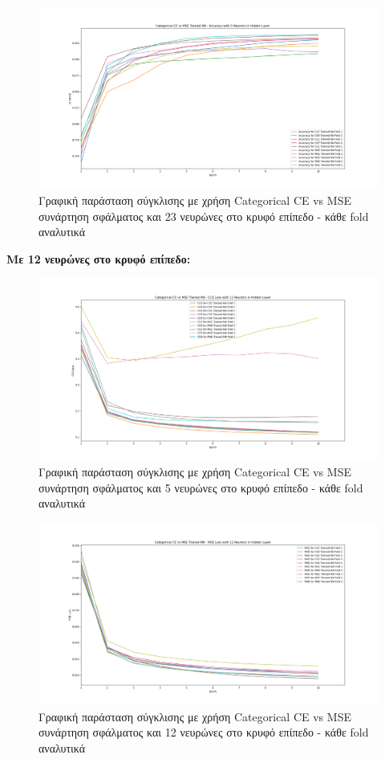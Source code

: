 \documentclass[12pt,a4paper]{article}
\begin{document}
\begin{figure}[H]
	\includegraphics[width=\textwidth]{Screenshots/3. CCE vs MSE - Accuracy - 5 Neurons.png}
	\caption{Γραφική παράσταση σύγκλισης με χρήση Categorical CE vs MSE συνάρτηση σφάλματος και 23 νευρώνες στο κρυφό επίπεδο - κάθε fold αναλυτικά}
\end{figure}

\textbf{Με 12 νευρώνες στο κρυφό επίπεδο:}

\begin{figure}[H]
	\includegraphics[width=\textwidth]{Screenshots/4. CCE vs MSE - CCE Loss - 12 Neurons.png}
	\caption{Γραφική παράσταση σύγκλισης με χρήση Categorical CE vs MSE συνάρτηση σφάλματος και 5 νευρώνες στο κρυφό επίπεδο - κάθε fold αναλυτικά}
\end{figure}

\begin{figure}[H]
	\includegraphics[width=\textwidth]{Screenshots/5. CCE vs MSE - MSE Loss - 12 Neurons.png}
	\caption{Γραφική παράσταση σύγκλισης με χρήση Categorical CE vs MSE συνάρτηση σφάλματος και 12 νευρώνες στο κρυφό επίπεδο - κάθε fold αναλυτικά}
\end{figure}
\end{document}
